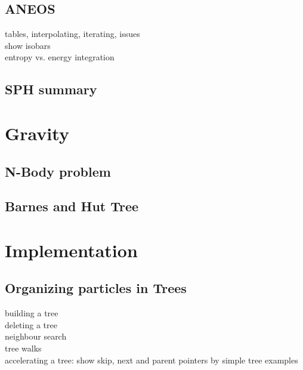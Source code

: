 \subsection{ANEOS}
tables, interpolating, iterating, issues\\
show isobars\\
entropy vs. energy integration\\

\subsection{SPH summary}


\citep{Abel:2010p3297}
\citep{Barnes:1986p2853}
\citep{Monaghan:2005p2677}
\citep{Ott:2003p3727}
\citep{Price:2004p2613}
\citep{Solenthaler:2008p3720}
\citep{Springel:2003p3298}
\citep{Monaghan:1992ARAA..30..543M}

% 

\section{Gravity}

\subsection{N-Body problem}

\subsection{Barnes and Hut Tree}







\section{Implementation}
\subsection{Organizing particles in Trees}
building a tree\\
deleting a tree\\
neighbour search\\
tree walks\\
accelerating a tree: show skip, next and parent pointers by simple tree examples\\

